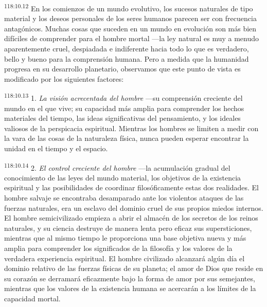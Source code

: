 \documentclass[twoside, 11pt]{book}
\begin{document}
\par
\textsuperscript{118:10.12} En los comienzos de un mundo evolutivo, los sucesos naturales de tipo material y los deseos personales de los seres humanos parecen ser con frecuencia antagónicos. Muchas cosas que suceden en un mundo en evolución son más bien difíciles de comprender para el hombre mortal ---la ley natural es muy a menudo aparentemente cruel, despiadada e indiferente hacia todo lo que es verdadero, bello y bueno para la comprensión humana. Pero a medida que la humanidad progresa en su desarrollo planetario, observamos que este punto de vista es modificado por los siguientes factores:

\par
\textsuperscript{118:10.13} 1. \textit{La visión acrecentada del hombre} ---su comprensión creciente del mundo en el que vive; su capacidad más amplia para comprender los hechos materiales del tiempo, las ideas significativas del pensamiento, y los ideales valiosos de la perspicacia espiritual. Mientras los hombres se limiten a medir con la vara de las cosas de la naturaleza física, nunca pueden esperar encontrar la unidad en el tiempo y el espacio.

\par
\textsuperscript{118:10.14} 2. \textit{El control creciente del hombre} ---la acumulación gradual del conocimiento de las leyes del mundo material, los objetivos de la existencia espiritual y las posibilidades de coordinar filosóficamente estas dos realidades. El hombre salvaje se encontraba desamparado ante los violentos ataques de las fuerzas naturales, era un esclavo del dominio cruel de sus propios miedos internos. El hombre semicivilizado empieza a abrir el almacén de los secretos de los reinos naturales, y su ciencia destruye de manera lenta pero eficaz sus supersticiones, mientras que al mismo tiempo le proporciona una base objetiva nueva y más amplia para comprender los significados de la filosofía y los valores de la verdadera experiencia espiritual. El hombre civilizado alcanzará algún día el dominio relativo de las fuerzas físicas de su planeta; el amor de Dios que reside en su corazón se derramará eficazmente bajo la forma de amor por sus semejantes, mientras que los valores de la existencia humana se acercarán a los límites de la capacidad mortal.
\end{document}
